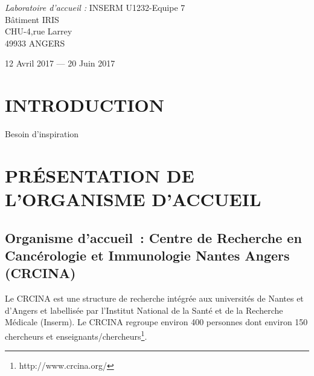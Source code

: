 \documentclass[a4paper,10pt]{article}
\newcommand\tabA[1][0.5cm]{\hspace*{#1}}
\newcommand\tabC[1][2cm]{\hspace*{#1}}
\begin{document}
\begin{titlepage}
\begin{sffamily}
\begin{center}
\begin{minipage}{9\textwidth}
\begin{doublespace}
\begin{tabular}{cl}
    \end{tabular}
     \end{doublespace}
    \emph{Laboratoire d'accueil :} \tabC \tabA \textsc{INSERM U1232}-Equipe 7
    \\\tabC \tabC \tabC \tabA Bâtiment IRIS 
    \\\tabC \tabC \tabC \tabA CHU-4,rue Larrey 
    \\\tabC \tabC \tabC \tabA 49933 ANGERS
    \end{minipage}
    \vspace*{\fill}
%  

    {\large 12 Avril 2017 — 20 Juin 2017}

  \end{center}
  \end{sffamily}
\end{titlepage}
\newpage
\tableofcontents
\newpage
\listoffigures
\newpage
\listoftables
\newpage
\section{INTRODUCTION }
Besoin d'inspiration
\section{PR\'{E}SENTATION DE L'ORGANISME D'ACCUEIL }
\subsection{Organisme d’accueil : Centre de Recherche en Cancérologie et Immunologie Nantes Angers (CRCINA)}
Le CRCINA est une structure de recherche intégrée aux universités de Nantes et d’Angers et labellisée par l’Institut National de la Santé et de la Recherche Médicale (Inserm). 
Le CRCINA regroupe environ 400 personnes dont environ 150 chercheurs et enseignants/chercheurs\footnote{http://www.crcina.org/}.
\end{document}
